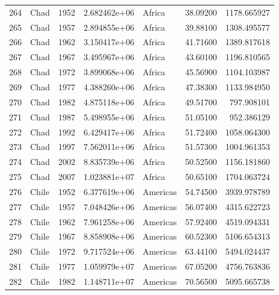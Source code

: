 \documentclass[
  letterpaper,
  DIV=11,
  numbers=noendperiod]{scrreprt}
\begin{document}
\begin{tabular}{llrrlrr}
264  &                      Chad &  1952 &  2.682462e+06 &    Africa &  38.09200 &    1178.665927 \\
265  &                      Chad &  1957 &  2.894855e+06 &    Africa &  39.88100 &    1308.495577 \\
266  &                      Chad &  1962 &  3.150417e+06 &    Africa &  41.71600 &    1389.817618 \\
267  &                      Chad &  1967 &  3.495967e+06 &    Africa &  43.60100 &    1196.810565 \\
268  &                      Chad &  1972 &  3.899068e+06 &    Africa &  45.56900 &    1104.103987 \\
269  &                      Chad &  1977 &  4.388260e+06 &    Africa &  47.38300 &    1133.984950 \\
270  &                      Chad &  1982 &  4.875118e+06 &    Africa &  49.51700 &     797.908101 \\
271  &                      Chad &  1987 &  5.498955e+06 &    Africa &  51.05100 &     952.386129 \\
272  &                      Chad &  1992 &  6.429417e+06 &    Africa &  51.72400 &    1058.064300 \\
273  &                      Chad &  1997 &  7.562011e+06 &    Africa &  51.57300 &    1004.961353 \\
274  &                      Chad &  2002 &  8.835739e+06 &    Africa &  50.52500 &    1156.181860 \\
275  &                      Chad &  2007 &  1.023881e+07 &    Africa &  50.65100 &    1704.063724 \\
276  &                     Chile &  1952 &  6.377619e+06 &  Americas &  54.74500 &    3939.978789 \\
277  &                     Chile &  1957 &  7.048426e+06 &  Americas &  56.07400 &    4315.622723 \\
278  &                     Chile &  1962 &  7.961258e+06 &  Americas &  57.92400 &    4519.094331 \\
279  &                     Chile &  1967 &  8.858908e+06 &  Americas &  60.52300 &    5106.654313 \\
280  &                     Chile &  1972 &  9.717524e+06 &  Americas &  63.44100 &    5494.024437 \\
281  &                     Chile &  1977 &  1.059979e+07 &  Americas &  67.05200 &    4756.763836 \\
282  &                     Chile &  1982 &  1.148711e+07 &  Americas &  70.56500 &    5095.665738 \\

\end{tabular}
\end{document}
